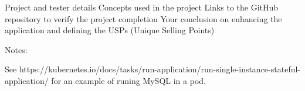 \mysubitem Project and tester details
\mysubitem Concepts used in the project
\mysubitem Links to the GitHub repository to verify the project completion
\mysubitem Your conclusion on enhancing the application and defining the USPs (Unique Selling Points)


Notes:

See https://kubernetes.io/docs/tasks/run-application/run-single-instance-stateful-application/ for an example of runing
MySQL in a pod.



\bye
